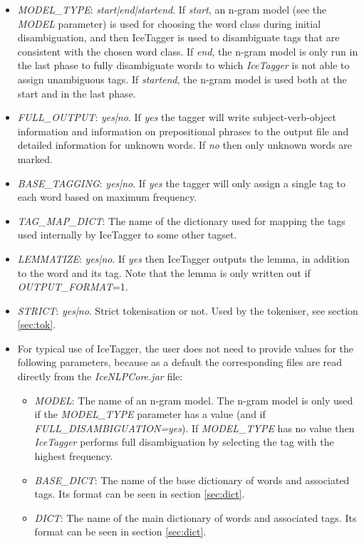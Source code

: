 \documentclass[11pt]{article}
\begin{document}
\begin{itemize}
\begin{itemize}
\item \emph{MODEL\_TYPE}: \emph{start|end|startend}. If \emph{start}, an n-gram model (see the \emph{MODEL} parameter) is used for choosing the word class during initial disambiguation, and then IceTagger is used to disambiguate tags that are consistent with the chosen word class. If \emph{end}, the n-gram model is only run in the last phase to fully disambiguate words to which \emph{IceTagger} is not able to assign unambiguous tags.  If \emph{startend}, the n-gram model is used both at the start and in the last phase.  
\item \emph{FULL\_OUTPUT}: \emph{yes|no}. If \emph{yes} the tagger will write  subject-verb-object information and information on prepositional phrases to the output file and detailed information for unknown words. If \emph{no} then only unknown words are marked.
\item \emph{BASE\_TAGGING}: \emph{yes|no}. If \emph{yes} the tagger will only assign a single tag to each word based on maximum frequency.
\item \emph{TAG\_MAP\_DICT}: The name of the dictionary used for mapping the tags used internally by IceTagger to some other tagset.
\item \emph{LEMMATIZE}: \emph{yes|no}. If \emph{yes} then IceTagger outputs the lemma, in addition to the word and its tag. Note that the lemma is only written out if \emph{OUTPUT\_FORMAT}=1. 
\item \emph{STRICT}: \emph{yes|no}. Strict tokenisation or not. Used by the tokeniser, see section \ref{sec:tok}.
\item For typical use of IceTagger, the user does not need to provide values for the following parameters, because as a default the corresponding files are read directly from the \emph{IceNLPCore.jar} file:
\begin{itemize}
\item \emph{MODEL}: The name of an n-gram model. The n-gram model is only used if the \emph{MODEL\_TYPE} parameter has a value (and if \emph{FULL\_DISAMBIGUATION=yes}). If \emph{MODEL\_TYPE} has no value then \emph{IceTagger} performs full disambiguation by selecting the tag with the highest frequency.
\item \emph{BASE\_DICT}: The name of the base dictionary of words and associated tags. Its format can be seen in section \ref{sec:dict}.
\item \emph{DICT}: The name of the main dictionary of words and associated tags. Its format can be seen in section \ref{sec:dict}.

\end{itemize}
\end{itemize}
\end{itemize}
\end{document}
